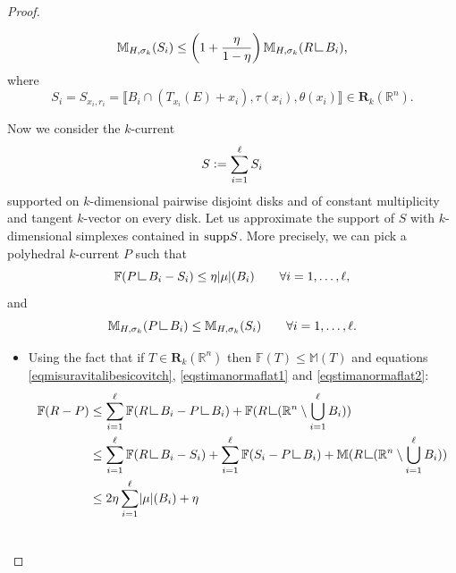 \documentclass{article}
\numberwithin{equation}{section}
\theoremstyle{plain}%
\theoremstyle{definition}
\theoremstyle{definition}
\newcommand{\rgrande}{\mathbb{R}}
\newcommand{\corrett}{\mathbf{R}_k(\rgrande^n)}
\newcommand{\normaflat}{\mathbb{F}}
\newcommand{\supp}{{\rm supp}}
\newcommand{\massa}{\mathbb{M}}
\newcommand{\massaanisotropa}{\mathbb{M}_{H,\sigma_k}}
\newcommand{\mrestr}{\mathop{\hbox{\vrule height 7pt width 0.5pt depth 0pt
\vrule height 0.5pt width 6pt depth 0pt}}\nolimits}
\DeclarePairedDelimiter{\valass}{\lvert}{\rvert} %
\newcommand{\indice}{\ell}
\begin{document}
\begin{proof}
\begin{enumerate}
\begin{equation}
        \massaanisotropa (S_i) \leq
        \left( 1 + \frac{\eta}{1- \eta} \right) \massaanisotropa(R \mrestr B_i )
        \text{,}
        \end{equation}
        where
        $$
        S_i = S_{x_i, r_i}= \llbracket B_i \cap (T_{x_i} (E) + x_i) , \tau(x_i) , \theta(x_i) \rrbracket \in \corrett
        \text{.}
        $$
    \end{enumerate}
    Now we consider the $k$-current
    \begin{equation*}
    S \vcentcolon = \sum_{i=1}^{\indice} S_i
    \end{equation*}
    supported on $k$-dimensional pairwise disjoint disks and of constant multiplicity and tangent $k$-vector on every disk. Let us approximate the support of $S$ with $k$-dimensional simplexes contained in $\supp S$. More precisely, we can pick a polyhedral $k$-current $P$ such that
    \begin{equation}\label{eqstimanormaflat2}
    \normaflat(P \mrestr B_i - S_i ) \leq \eta \valass{\mu}(B_i) \qquad \forall i = 1, \ldots, \indice
    \text{,}
    \end{equation} and
    \begin{equation}\label{eqstimamassaanisotropa1}
        \massaanisotropa (P \mrestr B_i) \leq \massaanisotropa (S_i) \qquad \forall i = 1, \ldots, \indice
        \text{.}
    \end{equation}
    \begin{itemize}
        \item Using the fact that if $T \in \corrett$ then $\normaflat(T) \leq \massa(T)$ and equations \eqref{eqmisuravitalibesicovitch}, \eqref{eqstimanormaflat1} and \eqref{eqstimanormaflat2}:
            \begin{equation*}
                \begin{split}
                    \normaflat(R - P) &
                    \leq \sum_{i=1}^{\indice} \normaflat (R \mrestr B_i - P \mrestr B_i) + \normaflat (R \mrestr (\rgrande^n \setminus \bigcup_{i=1}^{\indice} B_i)) \\
                    &
                    \leq
                    \sum_{i=1}^{\indice} \normaflat (R \mrestr B_i - S_i) + \sum_{i=1}^{\indice} \normaflat (S_i - P \mrestr B_i) + \massa (R \mrestr (\rgrande^n \setminus \bigcup_{i=1}^{\indice} B_i)) \\
                    &
                    \leq
                    2 \eta \sum_{i=1}^{\indice} \valass{\mu} (B_i) + \eta \\
                    &

\end{split}
\end{equation*}
\end{itemize}
\end{proof}
\end{document}
